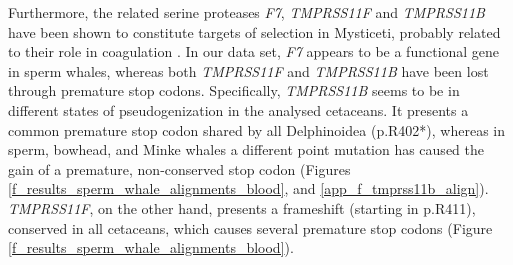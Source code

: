 Furthermore, the related serine proteases \textit{F7}, \textit{TMPRSS11F} and \textit{TMPRSS11B} have been shown to constitute targets of selection in Mysticeti, probably related to their role in coagulation \cite{Keane2015}.
In our data set, \textit{F7} appears to be a functional gene in sperm whales, whereas both \textit{TMPRSS11F} and \textit{TMPRSS11B} have been lost through premature stop codons.
Specifically, \textit{TMPRSS11B} seems to be in different states of pseudogenization in the analysed cetaceans.
It presents a common premature stop codon shared by all Delphinoidea ({p.R402*}), whereas in sperm, bowhead, and Minke whales a different point mutation has caused the gain of a premature, non-conserved stop codon (Figures \ref{f_results_sperm_whale_alignments_blood}, and \ref{app_f_tmprss11b_align}).
\textit{TMPRSS11F}, on the other hand, presents a frameshift (starting in {p.R411}), conserved in all cetaceans, which causes several premature stop codons (Figure \ref{f_results_sperm_whale_alignments_blood}).



